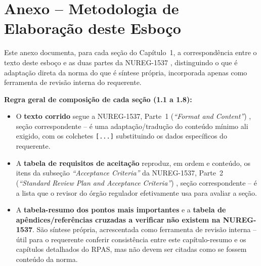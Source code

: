 \section*{Anexo -- Metodologia de Elabora\c{c}\~ao deste Esbo\c{c}o}
\label{sec:anexo-metodologia}

Este anexo documenta, para cada se\c{c}\~ao do Cap\'itulo~1, a
correspond\^encia entre o texto deste esbo\c{c}o e as duas partes da
NUREG-1537 \citep{nureg1537p1,nureg1537p2}, distinguindo o que \'e
adapta\c{c}\~ao direta da norma do que \'e s\'intese pr\'opria,
incorporada apenas como ferramenta de revis\~ao interna do requerente.

\textbf{Regra geral de composi\c{c}\~ao de cada se\c{c}\~ao (1.1 a 1.8):}

\begin{itemize}
\item O \textbf{texto corrido} segue a NUREG-1537, Parte~1
  (\emph{``Format and Content''}) \citep{nureg1537p1}, se\c{c}\~ao
  correspondente -- \'e uma adapta\c{c}\~ao/tradu\c{c}\~ao do conte\'udo
  m\'inimo ali exigido, com os colchetes \texttt{[...]} substituindo os
  dados espec\'ificos do requerente.
\item A \textbf{tabela de requisitos de aceita\c{c}\~ao} reproduz, em
  ordem e conte\'udo, os itens da subse\c{c}\~ao \emph{``Acceptance
  Criteria''} da NUREG-1537, Parte~2 (\emph{``Standard Review Plan and
  Acceptance Criteria''}) \citep{nureg1537p2}, se\c{c}\~ao
  correspondente -- \'e a lista que o revisor do \'org\~ao regulador
  efetivamente usa para avaliar a se\c{c}\~ao.
\item A \textbf{tabela-resumo dos pontos mais importantes} e a
  \textbf{tabela de ap\^endices/refer\^encias cruzadas a verificar}
  \textbf{n\~ao existem na NUREG-1537}. S\~ao s\'intese pr\'opria,
  acrescentada como ferramenta de revis\~ao interna -- \'util para o
  requerente conferir consist\^encia entre este cap\'itulo-resumo e os
  cap\'itulos detalhados do RPAS, mas n\~ao devem ser citadas como se
  fossem conte\'udo da norma.
\end{itemize}

